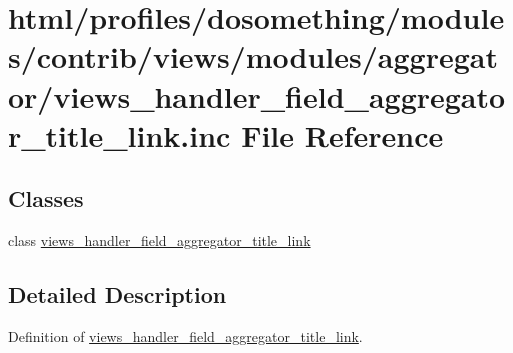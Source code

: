 \hypertarget{views__handler__field__aggregator__title__link_8inc}{
\section{html/profiles/dosomething/modules/contrib/views/modules/aggregator/views\_\-handler\_\-field\_\-aggregator\_\-title\_\-link.inc File Reference}
\label{views__handler__field__aggregator__title__link_8inc}
}
\subsection*{Classes}
\begin{DoxyCompactItemize}
\item 
class \hyperlink{classviews__handler__field__aggregator__title__link}{views\_\-handler\_\-field\_\-aggregator\_\-title\_\-link}
\end{DoxyCompactItemize}


\subsection{Detailed Description}
Definition of \hyperlink{classviews__handler__field__aggregator__title__link}{views\_\-handler\_\-field\_\-aggregator\_\-title\_\-link}. 
